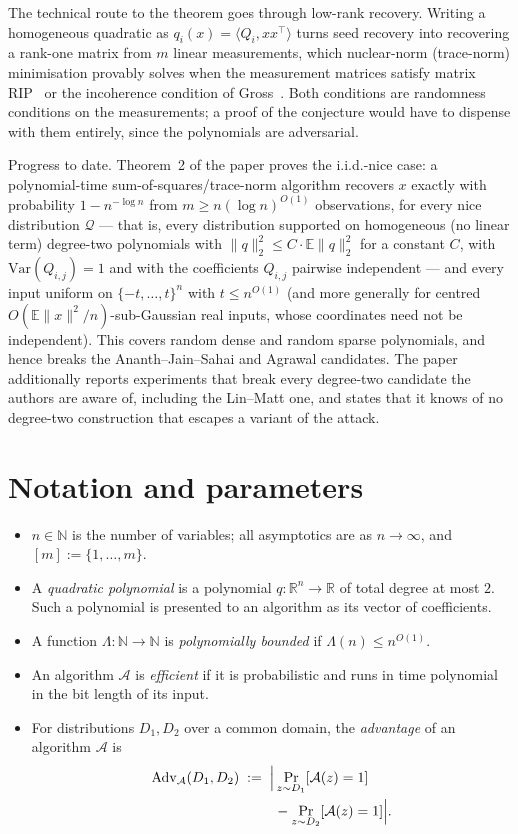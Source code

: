 \documentclass{aicr-conjecture}
\newcommand{\RR}{\mathbb{R}}
\newcommand{\NN}{\mathbb{N}}
\newcommand{\EE}{\mathbb{E}}
\newcommand{\cA}{\mathcal{A}}
\newcommand{\cQ}{\mathcal{Q}}
\newcommand{\Adv}{\mathrm{Adv}}
\begin{document}
The technical route to the theorem goes through low-rank recovery.
Writing a homogeneous quadratic as
$q_i(x) = \langle Q_i, xx^{\top} \rangle$ turns seed recovery into
recovering a rank-one matrix from $m$ linear measurements, which
nuclear-norm (trace-norm) minimisation provably solves when the
measurement matrices satisfy matrix RIP~\cite{RFP} or the incoherence
condition of Gross~\cite{Gross}. Both conditions are randomness
conditions on the measurements; a proof of the conjecture would have to
dispense with them entirely, since the polynomials are adversarial.

Progress to date. Theorem~2 of the paper proves the i.i.d.-nice case: a
polynomial-time sum-of-squares/trace-norm algorithm recovers $x$
exactly with probability $1 - n^{-\log n}$ from
$m \ge n(\log n)^{O(1)}$ observations, for every nice distribution
$\cQ$ --- that is, every distribution supported on homogeneous (no
linear term) degree-two polynomials with
$\|q\|_2^2 \le C \cdot \EE\|q\|_2^2$ for a constant $C$, with
$\mathrm{Var}(Q_{i,j}) = 1$ and with the coefficients $Q_{i,j}$
pairwise independent --- and every input uniform on
$\{-t, \dots, t\}^n$ with $t \le n^{O(1)}$ (and more generally for
centred $O(\EE\|x\|^2/n)$-sub-Gaussian real inputs, whose coordinates
need not be independent). This covers random dense and random sparse
polynomials, and hence breaks the Ananth--Jain--Sahai and Agrawal
candidates. The paper additionally reports experiments that break every
degree-two candidate the authors are aware of, including the Lin--Matt
one, and states that it knows of no degree-two construction that
escapes a variant of the attack.

\section{Notation and parameters}\label{sec:notation}

\begin{itemize}[leftmargin=1.2em]
  \item $n \in \NN$ is the number of variables; all asymptotics are as
  $n \to \infty$, and $[m] := \{1, \dots, m\}$.
  \item A \emph{quadratic polynomial} is a polynomial
  $q : \RR^n \to \RR$ of total degree at most $2$. Such a polynomial is
  presented to an algorithm as its vector of coefficients.
  \item A function $\Lambda : \NN \to \NN$ is \emph{polynomially
  bounded} if $\Lambda(n) \le n^{O(1)}$.
  \item An algorithm $\cA$ is \emph{efficient} if it is probabilistic
  and runs in time polynomial in the bit length of its input.
  \item For distributions $D_1, D_2$ over a common domain, the
  \emph{advantage} of an algorithm $\cA$ is
  \begin{align*}
    \Adv_{\cA}(D_1, D_2) \;:=\; \Bigl|
      &\Pr_{z \sim D_1}[\cA(z) = 1] \\
      &{}- \Pr_{z \sim D_2}[\cA(z) = 1] \Bigr| .
  \end{align*}
\end{itemize}
\end{document}
